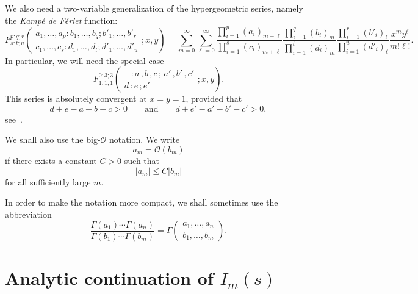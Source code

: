 \documentclass{article}
\theoremstyle{boldremark}
\renewcommand\[{\begin{equation}}
\renewcommand\]{\end{equation}}
\theoremstyle{definition}
\numberwithin{equation}{section}
\begin{document}
We also need a two-variable generalization of the hypergeometric series, 
namely the \textit{Kampé de Fériet} function:
\[
F^{p:q;r}_{s:t;u} \left(
\begin{matrix}
a_1,\dots,a_p : b_1,\dots,b_q ; b'_1,\dots,b'_r \\[3pt]
c_1,\dots,c_s : d_1,\dots,d_t ; d'_1,\dots,d'_u
\end{matrix}
; x,y
\right)
=
\sum_{m=0}^{\infty}\sum_{\ell=0}^{\infty}
\frac{\prod_{i=1}^{p}(a_i)_{m+\ell}}
     {\prod_{i=1}^{s}(c_i)_{m+\ell}}
\frac{\prod_{i=1}^{q}(b_i)_m}
     {\prod_{i=1}^{t}(d_i)_m}
\frac{\prod_{i=1}^{r}(b'_i)_\ell}
     {\prod_{i=1}^{u}(d'_i)_\ell}
\frac{x^m y^\ell}{m!\ell!}.
\]
In particular, we will need the special case
$$
F^{0:3;3}_{1:1;1} \left(
\begin{matrix}
- : a\,,b\,,c\, ;\,a'\,,b'\,,c' \\[3pt]
d\, : e\,; e'
\end{matrix}
; x,y
\right).
$$
This series is absolutely convergent at \(x=y=1\), provided that
$$
d+e-a-b-c>0
\qquad\text{and}\qquad
d+e'-a'-b'-c'>0,
$$
see~\cite{pitre1996}.

We shall also use the big-\(\mathcal{O}\) notation. We write
$$
a_m = \mathcal{O}(b_m)
$$
if there exists a constant \(C>0\) such that
$$
|a_m| \leq C |b_m|
$$
for all sufficiently large \(m\).

In order to make the notation more compact, we shall sometimes use the abbreviation
$$
\frac{\Gamma(a_1)\cdots\Gamma(a_n)}
     {\Gamma(b_1)\cdots\Gamma(b_m)}
=
\Gamma\!\left(
\begin{matrix}
a_1,\dots,a_n
\\
b_1,\dots,b_m
\end{matrix}
\right).
$$
\section{Analytic continuation of $I_m(s)$}
\end{document}
